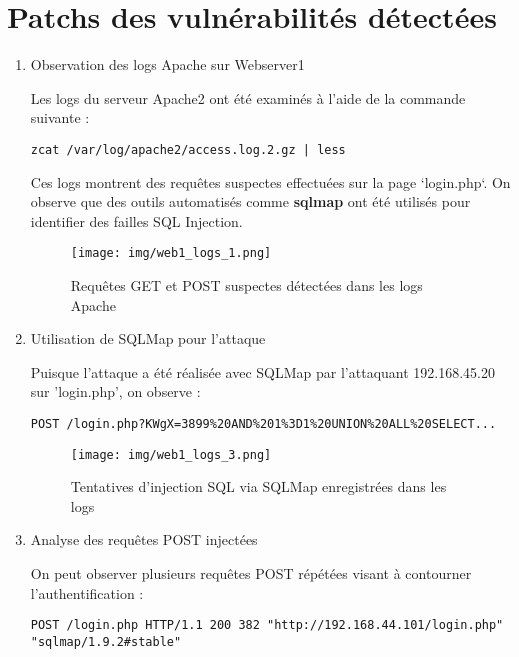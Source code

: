 \documentclass[a4paper,12pt]{report}
\begin{document}
\section{Patchs des vulnérabilités détectées}

\begin{enumerate}
\item Observation des logs Apache sur Webserver1

Les logs du serveur Apache2 ont été examinés à l'aide de la commande suivante :

\begin{lstlisting}
zcat /var/log/apache2/access.log.2.gz | less
\end{lstlisting}

Ces logs montrent des requêtes suspectes effectuées sur la page `login.php`. On observe que des outils automatisés comme \textbf{sqlmap} ont été utilisés pour identifier des failles SQL Injection.

\begin{figure}[H]
    \centering
    \texttt{[image: img/web1\_logs\_1.png]}
    \caption{Requêtes GET et POST suspectes détectées dans les logs Apache}
\end{figure}

\item Utilisation de SQLMap pour l'attaque

Puisque l'attaque a été réalisée avec SQLMap par l’attaquant 192.168.45.20 sur 'login.php', on observe :

\begin{lstlisting}
POST /login.php?KWgX=3899%20AND%201%3D1%20UNION%20ALL%20SELECT...
\end{lstlisting}

\begin{figure}[H]
    \centering
    \texttt{[image: img/web1\_logs\_3.png]}
    \caption{Tentatives d'injection SQL via SQLMap enregistrées dans les logs}
\end{figure}

\item Analyse des requêtes POST injectées

On peut observer plusieurs requêtes POST répétées visant à contourner l'authentification :

\begin{lstlisting}
POST /login.php HTTP/1.1 200 382 "http://192.168.44.101/login.php" "sqlmap/1.9.2#stable"
\end{lstlisting}




\end{enumerate}
\end{document}
